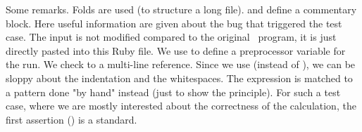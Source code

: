 Some remarks. Folds are used (to structure a long file).  and 
define a commentary block. Here useful information are given about the bug that
triggered the test case. The input is not modified compared to the original
\FORM\ program, it is just directly pasted into this Ruby file. We use
 to define a preprocessor variable for the run. We check
 to a multi-line reference. Since we use  (instead of
), we can be sloppy about the indentation and the whitespaces.
The expression  is matched to a pattern done "by hand" instead (just to
show the principle). For such a test case, where we are mostly interested about
the correctness of the calculation, the first assertion ()
is a standard.

